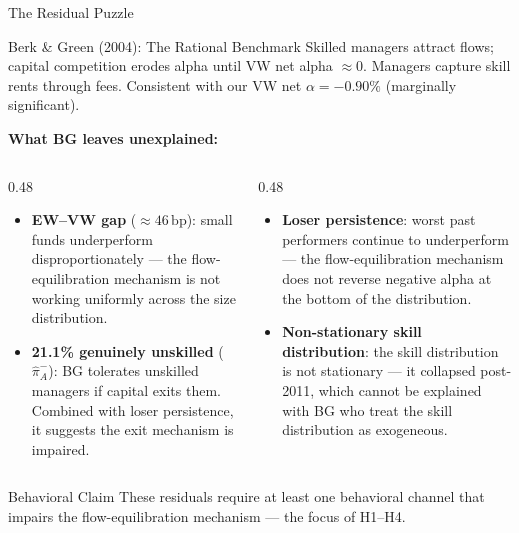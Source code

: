 \documentclass[10pt, aspectratio=169]{beamer}
\newcommand{\bp}{\,\text{bp}}
\begin{document}
\begin{frame}{The Residual Puzzle}
  \begin{block}{Berk \& Green (2004): The Rational Benchmark}
    \small Skilled managers attract flows; capital competition erodes alpha until
    VW net alpha $\approx 0$. Managers capture skill rents through fees.
    Consistent with our VW net $\alpha = -0.90\%$ (marginally significant).
  \end{block}
  \vspace{3pt}
  \textbf{What BG leaves unexplained:}
  \vspace{3pt}
  \begin{columns}[T]
    \begin{column}{0.48\textwidth}
      \begin{itemize}\itemsep4pt
        \item \textbf{EW–VW gap} ($\approx 46\bp$): small funds underperform
              disproportionately — the flow-equilibration mechanism is
              not working uniformly across the size distribution.
        \item \textbf{21.1\% genuinely unskilled} ($\hat{\pi}^-_A$): BG
              tolerates unskilled managers if capital exits them.
              Combined with loser persistence, it suggests the
              exit mechanism is impaired.
      \end{itemize}
    \end{column}
    \begin{column}{0.48\textwidth}
      \begin{itemize}\itemsep4pt
        \item \textbf{Loser persistence}: worst past performers continue
              to underperform — the flow-equilibration mechanism
              does not reverse negative alpha at the bottom of the
              distribution.
        \item \textbf{Non-stationary skill distribution}: the skill
              distribution is not stationary — it collapsed
              post-2011, which cannot be explained with BG who treat the skill distribution as exogeneous.
      \end{itemize}
    \end{column}
  \end{columns}
  \vspace{4pt}
  \begin{block}{Behavioral Claim}
    \small These residuals require at least one behavioral channel
    that impairs the flow-equilibration mechanism — the focus of H1--H4.
  \end{block}
\end{frame}
\end{document}

